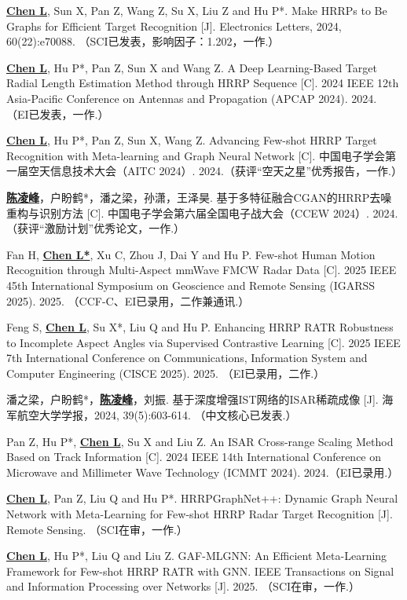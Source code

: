 \begin{resume}
\begin{enumerate}[label={[\arabic*]},itemsep=0pt,parsep=0pt,labelindent=26pt,labelwidth=*,leftmargin=0pt,itemindent=*,align=left]
  \item \textbf{\underline{Chen L}}, Sun X, Pan Z, Wang Z, Su X, Liu Z and Hu P*. Make HRRPs to Be Graphs for Efficient Target Recognition [J]. Electronics Letters, 2024, 60(22):e70088. （SCI已发表，影响因子：1.202，一作.）
  \item \textbf{\underline{Chen L}}, Hu P*, Pan Z, Sun X and Wang Z. A Deep Learning-Based Target Radial Length Estimation Method through HRRP Sequence [C]. 2024 IEEE 12th Asia-Pacific Conference on Antennas and Propagation (APCAP 2024). 2024. （EI已发表，一作.）
  \item \textbf{\underline{Chen L}}, Hu P*, Pan Z, Sun X, Wang Z. Advancing Few-shot HRRP Target Recognition with Meta-learning and Graph Neural Network [C]. 中国电子学会第一届空天信息技术大会（AITC 2024）. 2024.（获评“空天之星”优秀报告，一作.）
  \item \textbf{\underline{陈凌峰}}，{户盼鹤*}，潘之梁，孙潇，王泽昊. 基于多特征融合CGAN的HRRP去噪重构与识别方法 [C]. 中国电子学会第六届全国电子战大会（CCEW 2024）. 2024.（获评“激励计划”优秀论文，一作.）
  \item Fan H, \textbf{\underline{Chen L*}}, Xu C, Zhou J, Dai Y and Hu P. Few-shot Human Motion Recognition through Multi-Aspect mmWave FMCW Radar Data [C]. 2025 IEEE 45th International Symposium on Geoscience and Remote Sensing (IGARSS 2025). 2025. （CCF-C、EI已录用，二作兼通讯.）
  \item Feng S, \textbf{\underline{Chen L}}, Su X*, Liu Q and Hu P. Enhancing HRRP RATR Robustness to Incomplete Aspect Angles via Supervised Contrastive Learning [C]. 2025 IEEE 7th International Conference on Communications, Information System and Computer Engineering (CISCE 2025). 2025. （EI已录用，二作.）
  \item 潘之梁，户盼鹤*，\textbf{\underline{陈凌峰}}，刘振. 基于深度增强IST网络的ISAR稀疏成像 [J]. 海军航空大学学报，2024, 39(5):603-614. （中文核心已发表.）
  \item Pan Z, Hu P*, \textbf{\underline{Chen L}}, Su X and Liu Z. An ISAR Cross-range Scaling Method Based on Track Information [C]. 2024 IEEE 14th International Conference on Microwave and Millimeter Wave Technology (ICMMT 2024). 2024.（EI已录用.）
  \item \textbf{\underline{Chen L}}, Pan Z, Liu Q and Hu P*. HRRPGraphNet++: Dynamic Graph Neural Network with Meta-Learning for Few-shot HRRP Radar Target Recognition [J]. Remote Sensing. （SCI在审，一作.）
  \item \textbf{\underline{Chen L}}, Hu P*, Liu Q and Liu Z. GAF-MLGNN: An Efficient Meta-Learning Framework for Few-shot HRRP RATR with GNN. IEEE Transactions on Signal and Information Processing over Networks [J]. 2025. （SCI在审，一作.）

\end{enumerate}
\end{resume}
